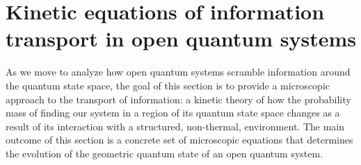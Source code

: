 \documentclass[draft,nofootinbib,pre,twocolumn,showpacs,showkeys,preprintnumbers,floatfix]{revtex4-1}
\newcommand{\1}{\mathbbm{1}}
\newcommand{\p}{\partial}
\begin{document}




\section{Kinetic equations of information transport in open quantum systems}
\label{sec:DYN}

As we move to analyze how open quantum systems scramble information around the
quantum state space, the goal of this section is to provide a microscopic approach
to the transport of information: a kinetic theory of how the probability mass of finding our system 
in a region of its quantum state space changes as a result of its interaction with a structured, non-thermal,
environment. The main outcome of this section is a concrete set of microscopic equations that determines
the evolution of the geometric quantum state of an open quantum system.
\end{document}
